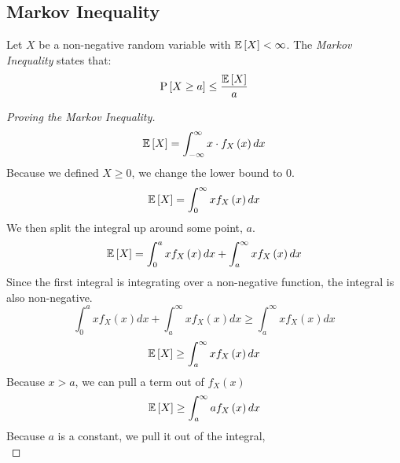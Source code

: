 	\subsection{Markov Inequality} \label{subsec:Markov Inequality}
		\begin{definition} \label{def:Markov Inequality}
			Let $X$ be a non-negative random variable with $\operatorname{\operatorname{\mathbb{E}}} \left[ X \right] < \infty$.
			The \emph{Markov Inequality} states that:
			\begin{equation} \label{eq:Markov Inequality}
				\operatorname{\operatorname{P}} \left[ X \geq a \right] \leq \frac{\operatorname{\operatorname{\mathbb{E}}}\left[ X \right]}{a}
			\end{equation}
		\end{definition}
		\begin{proof}[Proving the Markov Inequality] \label{proof:Markov Inequality}
			\begin{equation*}
				\operatorname{\operatorname{\mathbb{E}}} \left[ X \right] = \int_{-\infty}^{\infty} x \cdot f_{X} \left( x \right) dx 
			\end{equation*}
			Because we defined $X \geq 0$, we change the lower bound to $0$.
			\begin{equation*}
				\operatorname{\operatorname{\mathbb{E}}} \left[ X \right] = \int_{0}^{\infty} x f_{X} \left( x \right) dx 
			\end{equation*}
			We then split the integral up around some point, $a$.
			\begin{equation*}
				\operatorname{\operatorname{\mathbb{E}}} \left[ X \right] = \int_{0}^{a} x f_{X} \left( x \right) dx + \int_{a}^{\infty} x f_{X} \left( x \right) dx
			\end{equation*}
			Since the first integral is integrating over a non-negative function, the integral is also non-negative.
			\begin{equation*}
				\int_{0}^{a} x f_{X} \left( x \right) dx + \int_{a}^{\infty} x f_{X} \left( x \right) dx \geq \int_{a}^{\infty} x f_{X} \left( x \right) dx
			\end{equation*}
			\begin{equation*}
				\operatorname{\operatorname{\mathbb{E}}} \left[ X \right] \geq \int_{a}^{\infty} x f_{X} \left( x \right) dx
			\end{equation*}
			Because $x>a$, we can pull a term out of $f_{X} \left( x \right)$
			\begin{equation*}
				\operatorname{\operatorname{\mathbb{E}}} \left[ X \right] \geq \int_{a}^{\infty} a f_{X} \left(x \right) dx
			\end{equation*}
			Because $a$ is a constant, we pull it out of the integral,
			\begin{equation*}

\end{equation*}
\end{proof}
